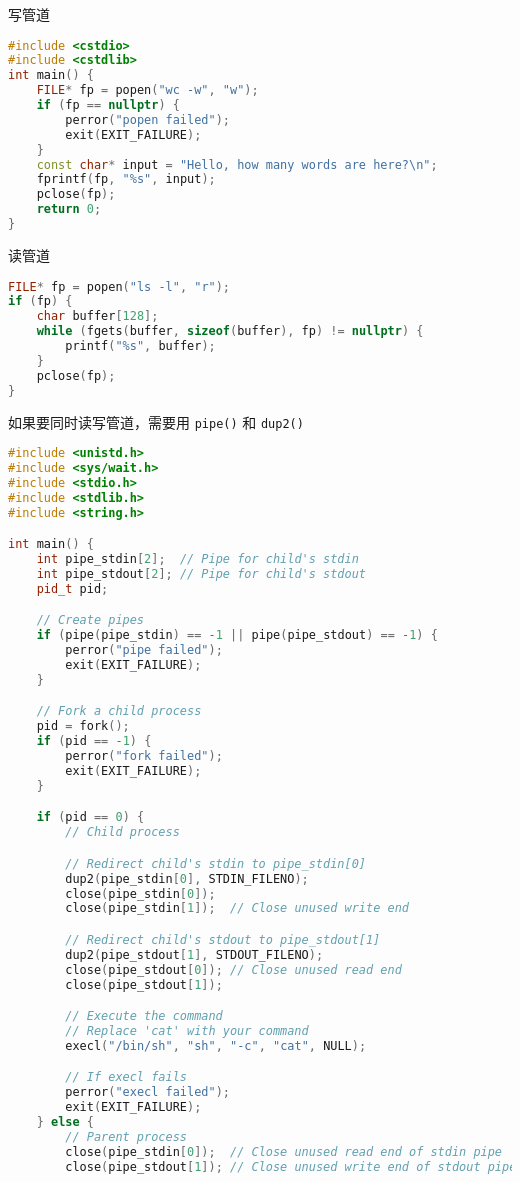 写管道
\begin{lstlisting}[language=cpp]
#include <cstdio>
#include <cstdlib>
int main() {
    FILE* fp = popen("wc -w", "w");
    if (fp == nullptr) {
        perror("popen failed");
        exit(EXIT_FAILURE);
    }
    const char* input = "Hello, how many words are here?\n";
    fprintf(fp, "%s", input);
    pclose(fp);
    return 0;
}
\end{lstlisting}
读管道
\begin{lstlisting}[language=cpp]
FILE* fp = popen("ls -l", "r");
if (fp) {
    char buffer[128];
    while (fgets(buffer, sizeof(buffer), fp) != nullptr) {
        printf("%s", buffer);
    }
    pclose(fp);
}
\end{lstlisting}

如果要同时读写管道，需要用 \verb`pipe()` 和 \verb`dup2()`
\begin{lstlisting}[language=cpp]
#include <unistd.h>
#include <sys/wait.h>
#include <stdio.h>
#include <stdlib.h>
#include <string.h>

int main() {
    int pipe_stdin[2];  // Pipe for child's stdin
    int pipe_stdout[2]; // Pipe for child's stdout
    pid_t pid;

    // Create pipes
    if (pipe(pipe_stdin) == -1 || pipe(pipe_stdout) == -1) {
        perror("pipe failed");
        exit(EXIT_FAILURE);
    }

    // Fork a child process
    pid = fork();
    if (pid == -1) {
        perror("fork failed");
        exit(EXIT_FAILURE);
    }

    if (pid == 0) {
        // Child process

        // Redirect child's stdin to pipe_stdin[0]
        dup2(pipe_stdin[0], STDIN_FILENO);
        close(pipe_stdin[0]);
        close(pipe_stdin[1]);  // Close unused write end

        // Redirect child's stdout to pipe_stdout[1]
        dup2(pipe_stdout[1], STDOUT_FILENO);
        close(pipe_stdout[0]); // Close unused read end
        close(pipe_stdout[1]);

        // Execute the command
        // Replace 'cat' with your command
        execl("/bin/sh", "sh", "-c", "cat", NULL);

        // If execl fails
        perror("execl failed");
        exit(EXIT_FAILURE);
    } else {
        // Parent process
        close(pipe_stdin[0]);  // Close unused read end of stdin pipe
        close(pipe_stdout[1]); // Close unused write end of stdout pipe


\end{lstlisting}
